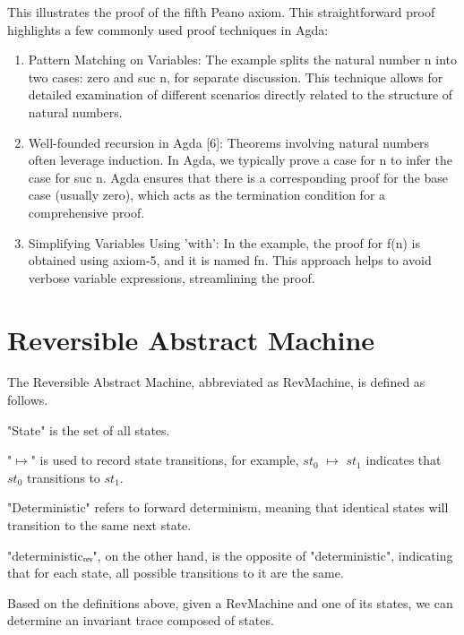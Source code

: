 
This illustrates the proof of the fifth Peano axiom. This straightforward proof highlights a few commonly used proof techniques in Agda:
\begin{enumerate}[1.]
\item Pattern Matching on Variables: The example splits the natural number n into two cases: zero and suc n, for separate discussion. This technique allows for detailed examination of different scenarios directly related to the structure of natural numbers.
\item Well-founded recursion in Agda [6]: Theorems involving natural numbers often leverage induction. In Agda, we typically prove a case for n to infer the case for suc n. Agda ensures that there is a corresponding proof for the base case (usually zero), which acts as the termination condition for a comprehensive proof.
\item Simplifying Variables Using 'with': In the example, the proof for f(n) is obtained using axiom-5, and it is named fn. This approach helps to avoid verbose variable expressions, streamlining the proof.
\end{enumerate}

\section{Reversible Abstract Machine}

The Reversible Abstract Machine, abbreviated as RevMachine, is defined as follows.



"State" is the set of all states.

"$\mapsto$" is used to record state transitions, for example, $st_{0}$ $\mapsto$ $st_{1}$ indicates that $st_{0}$ transitions to $st_{1}$.

"Deterministic" refers to forward determinism, meaning that identical states will transition to the same next state.

"deterministicᵣₑᵥ", on the other hand, is the opposite of "deterministic", indicating that for each state, all possible transitions to it are the same.

Based on the definitions above, given a RevMachine and one of its states, we can determine an invariant trace composed of states.


